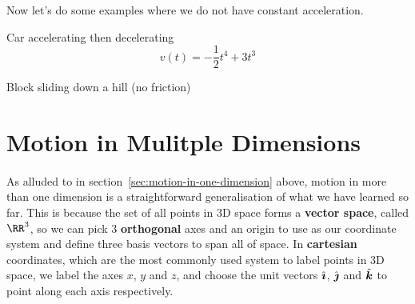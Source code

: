 \documentclass[../classical_mechanics.tex]{subfiles}
\begin{document}
        Now let's do some examples where we do not have constant acceleration.
        \begin{example}
            Car accelerating then decelerating %
            \begin{equation}
                v(t)=-\frac{1}{2}t^4+3t^3
            \end{equation}
        \end{example}
        \begin{example}
            Block sliding down a hill (no friction) %
        \end{example}

    \section{Motion in Mulitple Dimensions}\label{sec:motion-in-multiple-dimensions}
        \paragraph{}
        As alluded to in section~\ref{sec:motion-in-one-dimension} above, motion in more than one dimension is a straightforward generalisation of what we have learned so far.
        This is because the set of all points in 3D space forms a \textbf{vector space}, called $\RR^3$, so we can pick 3 \textbf{orthogonal} axes and an origin to use as our coordinate system and define three basis vectors to span all of space.
        In \textbf{cartesian} coordinates, which are the most commonly used system to label points in 3D space, we label the axes $x$, $y$ and $z$, and choose the unit vectors $\hat{\boldsymbol{\imath}}$, $\hat{\boldsymbol{\jmath}}$ and $\hat{\boldsymbol{k}}$ to point along each axis respectively.
        \begin{figure}[H]
            \centering
        \end{figure}
\end{document}
